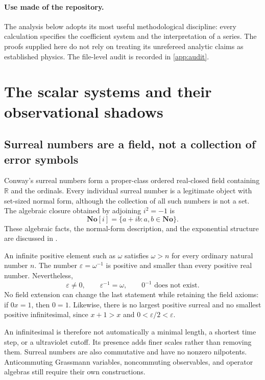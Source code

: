 \documentclass[11pt,a4paper]{article}
\numberwithin{equation}{section}
\theoremstyle{definition}
\theoremstyle{remark}
\newcommand{\R}{\mathbb R}
\newcommand{\No}{\mathbf{No}}
\newcommand{\Sc}{\No[i]}
\begin{document}
\paragraph{Use made of the repository.}
The analysis below adopts its most useful methodological discipline: every
calculation specifies the coefficient system and the interpretation of a series.
The proofs supplied here do not rely on treating its unrefereed analytic claims
as established physics. The file-level audit is recorded in
\cref{app:audit}.

\section{The scalar systems and their observational shadows}\label{sec:scalars}

\subsection{Surreal numbers are a field, not a collection of error symbols}
Conway's surreal numbers form a proper-class ordered real-closed field containing
$\R$ and the ordinals. Every individual surreal number is a legitimate object
with set-sized normal form, although the collection of all such numbers is not
a set. The algebraic closure obtained by adjoining $i^2=-1$ is
\[
\Sc=\{a+ib:a,b\in\No\}.
\]
These algebraic facts, the normal-form description, and the exponential
structure are discussed in \cite{BM,EK,Ehrlich}.

An infinite positive element such as $\omega$ satisfies $\omega>n$ for every
ordinary natural number $n$. The number $\varepsilon=\omega^{-1}$ is positive
and smaller than every positive real number. Nevertheless,
\[
\varepsilon\ne0,\qquad \varepsilon^{-1}=\omega,
\qquad 0^{-1}\text{ does not exist}.
\]
No field extension can change the last statement while retaining the field
axioms: if $0x=1$, then $0=1$. Likewise, there is no largest positive surreal and
no smallest positive infinitesimal, since $x+1>x$ and
$0<\varepsilon/2<\varepsilon$.

An infinitesimal is therefore not automatically a minimal length, a shortest
time step, or a ultraviolet cutoff. Its presence adds finer scales rather than
removing them. Surreal numbers are also commutative and have no nonzero
nilpotents. Anticommuting Grassmann variables, noncommuting observables, and
operator algebras still require their own constructions.
\end{document}
